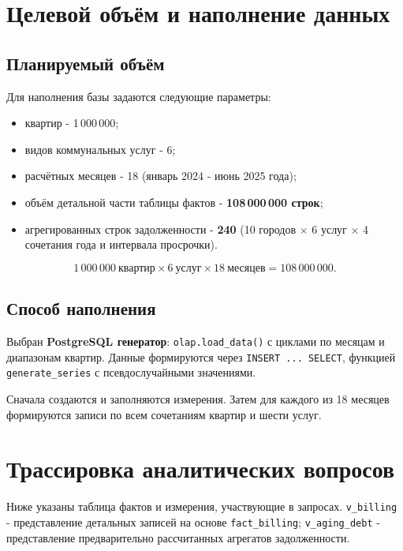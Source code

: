 \documentclass[12pt]{article}
\begin{document}
\section{Целевой объём и наполнение данных}
\subsection{Планируемый объём}
Для наполнения базы задаются следующие параметры:
\begin{itemize}
    \item квартир - 1\,000\,000;
    \item видов коммунальных услуг - 6;
    \item расчётных месяцев - 18 (январь 2024 - июнь 2025 года);
    \item объём детальной части таблицы фактов - \textbf{108\,000\,000 строк};
    \item агрегированных строк задолженности - \textbf{240} (10 городов $\times$ 6 услуг $\times$ 4 сочетания года и интервала просрочки).
\end{itemize}

\[
1\,000\,000\ \text{квартир}\times 6\ \text{услуг}\times 18\ \text{месяцев}
=108\,000\,000.
\]

\subsection{Способ наполнения}
Выбран \textbf{PostgreSQL генератор}: \texttt{olap.load\_data()} с циклами по месяцам и диапазонам квартир. Данные формируются через \texttt{INSERT ... SELECT}, функцией \texttt{generate\_series} с псевдослучайными значениями.

Сначала создаются и заполняются измерения. Затем для каждого из 18 месяцев формируются записи по всем сочетаниям квартир и шести услуг.

\section{Трассировка аналитических вопросов}
Ниже указаны таблица фактов и измерения, участвующие в запросах. \texttt{v\_billing} - представление детальных записей на основе \texttt{fact\_billing}; \texttt{v\_aging\_debt} - представление предварительно рассчитанных агрегатов задолженности.
\end{document}
